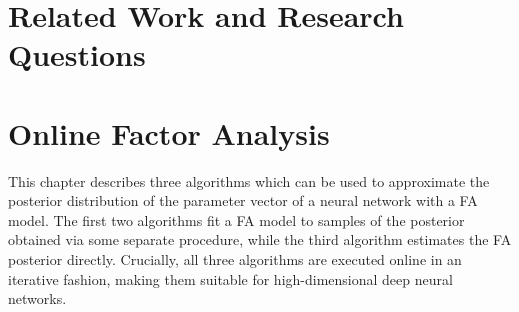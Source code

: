 \documentclass[msc,deptreport.inf]{infthesis} %
\newcommand{\matr}[1]{\mathbf{#1}}
\newcommand{\E}{\mathbb E}
\begin{document}
%
%
%


\chapter{Related Work and Research Questions}\label{ch:previous_work}


\chapter{Online Factor Analysis}\label{ch:online_fa}

This chapter describes three algorithms which can be used to approximate the posterior distribution of the parameter vector of a neural network with a FA model. The first two algorithms fit a FA model to samples of the posterior obtained via some separate procedure, while the third algorithm estimates the FA posterior directly. Crucially, all three algorithms are executed online in an iterative fashion, making them suitable for high-dimensional deep neural networks. 
\end{document}
